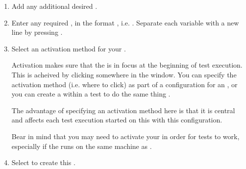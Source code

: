 \begin{enumerate}
\item Add any additional desired . 
\item Enter any required , in the
format , i.e. . 
Separate each variable with a new line by pressing .



\item Select an activation method for your \gdaut{}. 

Activation makes sure that the  \gdaut{} is in focus at the beginning of test execution. This is acheived by clicking somewhere in the \gdaut{} window. You can specify the activation method (i.e. where to click) as part of a configuration for an \gdaut{}, or you can create a \gdstep{} within a test to do the same thing . 

The advantage of specifying an activation method here is that it is central and affects each test execution started on this \gdaut{} with this configuration. 

Bear in mind that you may need to activate your \gdaut{} in order for tests to work, especially if the \gdaut{} runs on the same machine as \app{}. 


\item Select  to create this \gdproject{}. 

\end{enumerate}


\clearpage
